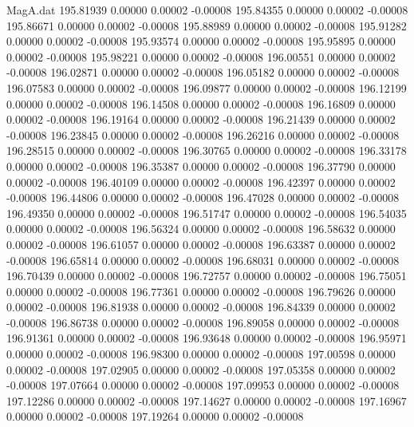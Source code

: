 \begin{filecontents}{MagA.dat}
 195.81939    0.00000    0.00002   -0.00008
 195.84355    0.00000    0.00002   -0.00008
 195.86671    0.00000    0.00002   -0.00008
 195.88989    0.00000    0.00002   -0.00008
 195.91282    0.00000    0.00002   -0.00008
 195.93574    0.00000    0.00002   -0.00008
 195.95895    0.00000    0.00002   -0.00008
 195.98221    0.00000    0.00002   -0.00008
 196.00551    0.00000    0.00002   -0.00008
 196.02871    0.00000    0.00002   -0.00008
 196.05182    0.00000    0.00002   -0.00008
 196.07583    0.00000    0.00002   -0.00008
 196.09877    0.00000    0.00002   -0.00008
 196.12199    0.00000    0.00002   -0.00008
 196.14508    0.00000    0.00002   -0.00008
 196.16809    0.00000    0.00002   -0.00008
 196.19164    0.00000    0.00002   -0.00008
 196.21439    0.00000    0.00002   -0.00008
 196.23845    0.00000    0.00002   -0.00008
 196.26216    0.00000    0.00002   -0.00008
 196.28515    0.00000    0.00002   -0.00008
 196.30765    0.00000    0.00002   -0.00008
 196.33178    0.00000    0.00002   -0.00008
 196.35387    0.00000    0.00002   -0.00008
 196.37790    0.00000    0.00002   -0.00008
 196.40109    0.00000    0.00002   -0.00008
 196.42397    0.00000    0.00002   -0.00008
 196.44806    0.00000    0.00002   -0.00008
 196.47028    0.00000    0.00002   -0.00008
 196.49350    0.00000    0.00002   -0.00008
 196.51747    0.00000    0.00002   -0.00008
 196.54035    0.00000    0.00002   -0.00008
 196.56324    0.00000    0.00002   -0.00008
 196.58632    0.00000    0.00002   -0.00008
 196.61057    0.00000    0.00002   -0.00008
 196.63387    0.00000    0.00002   -0.00008
 196.65814    0.00000    0.00002   -0.00008
 196.68031    0.00000    0.00002   -0.00008
 196.70439    0.00000    0.00002   -0.00008
 196.72757    0.00000    0.00002   -0.00008
 196.75051    0.00000    0.00002   -0.00008
 196.77361    0.00000    0.00002   -0.00008
 196.79626    0.00000    0.00002   -0.00008
 196.81938    0.00000    0.00002   -0.00008
 196.84339    0.00000    0.00002   -0.00008
 196.86738    0.00000    0.00002   -0.00008
 196.89058    0.00000    0.00002   -0.00008
 196.91361    0.00000    0.00002   -0.00008
 196.93648    0.00000    0.00002   -0.00008
 196.95971    0.00000    0.00002   -0.00008
 196.98300    0.00000    0.00002   -0.00008
 197.00598    0.00000    0.00002   -0.00008
 197.02905    0.00000    0.00002   -0.00008
 197.05358    0.00000    0.00002   -0.00008
 197.07664    0.00000    0.00002   -0.00008
 197.09953    0.00000    0.00002   -0.00008
 197.12286    0.00000    0.00002   -0.00008
 197.14627    0.00000    0.00002   -0.00008
 197.16967    0.00000    0.00002   -0.00008
 197.19264    0.00000    0.00002   -0.00008

\end{filecontents}
